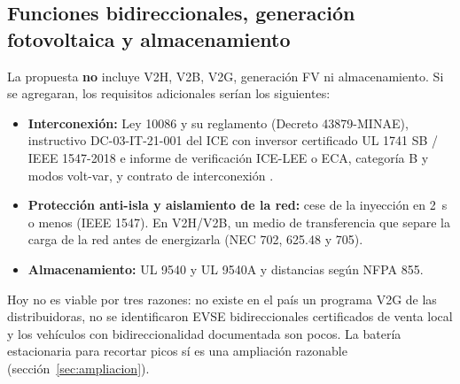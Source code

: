 \subsection{Funciones bidireccionales, generación fotovoltaica y almacenamiento}
\label{sec:bidir}
La propuesta \textbf{no} incluye V2H, V2B, V2G, generación FV ni almacenamiento. Si se agregaran, los requisitos adicionales serían los siguientes:
\begin{itemize}
\item \textbf{Interconexión:} Ley 10086 y su reglamento (Decreto 43879-MINAE), instructivo DC-03-IT-21-001 del ICE con inversor certificado UL 1741 SB / IEEE 1547-2018 e informe de verificación ICE-LEE o ECA, categoría B y modos volt-var, y contrato de interconexión \cite{ley10086,iceIT}.
\item \textbf{Protección anti-isla y aislamiento de la red:} cese de la inyección en 2~s o menos (IEEE 1547). En V2H/V2B, un medio de transferencia que separe la carga de la red antes de energizarla (NEC 702, 625.48 y 705).
\item \textbf{Almacenamiento:} UL 9540 y UL 9540A y distancias según NFPA 855.
\end{itemize}
Hoy no es viable por tres razones: no existe en el país un programa V2G de las distribuidoras, no se identificaron EVSE bidireccionales certificados de venta local y los vehículos con bidireccionalidad documentada son pocos. La batería estacionaria para recortar picos sí es una ampliación razonable (sección~\ref{sec:ampliacion}).

